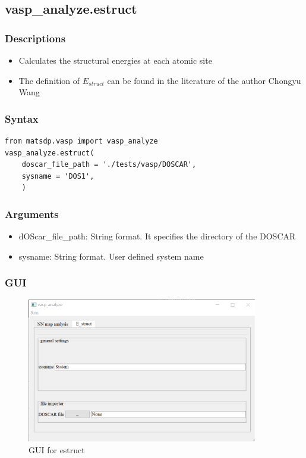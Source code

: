\documentclass[12pt]{book}
\begin{document}
\subsection{vasp\_analyze.estruct}
\subsubsection{Descriptions}
\begin{itemize}
\item Calculates the structural energies at each atomic site
\item The definition of $E_{struct}$ can be found in the literature of the author Chongyu Wang \cite{Chongyu1988PRB38, Chong-yu1990PRB41}
\end{itemize}

\subsubsection{Syntax}
\begin{lstlisting}
from matsdp.vasp import vasp_analyze
vasp_analyze.estruct(
    doscar_file_path = './tests/vasp/DOSCAR',
    sysname = 'DOS1',
    )
\end{lstlisting}

\subsubsection{Arguments}

\begin{itemize}
\item dOScar\_file\_path: String format. It specifies the directory of the DOSCAR
\item sysname: String format. User defined system name
\end{itemize}

\subsubsection{GUI}

\begin{figure}[htbp]
\centering
\includegraphics[width=0.9\textwidth]{gui_estruct.pdf}
\caption{GUI for estruct}
\label{fig:GUI_estruct}
\end{figure}
\end{document}
